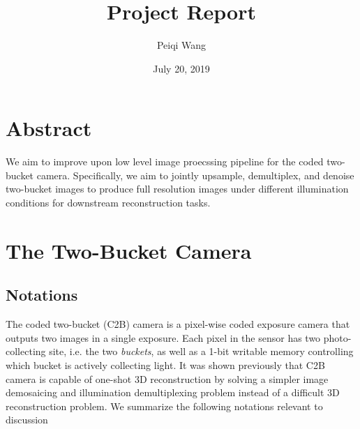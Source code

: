 \documentclass[11pt]{article}
\title{Project Report}
\author{Peiqi Wang}
\date{July 20, 2019}
\begin{document}
\maketitle
\newpage 
\tableofcontents
\newpage


\section{Abstract}
We aim to improve upon low level image proecssing pipeline for the coded two-bucket camera. Specifically, we aim to jointly upsample, demultiplex, and denoise two-bucket images to produce full resolution images under different illumination conditions for downstream reconstruction tasks.


\section{The Two-Bucket Camera}

\subsection{Notations}

The coded two-bucket (C2B) camera is a pixel-wise coded exposure camera that outputs two images in a single exposure.\cite{weiCodedTwoBucketCameras2018} Each pixel in the sensor has two photo-collecting site, i.e. the two \textit{buckets}, as well as a 1-bit writable memory controlling which bucket is actively collecting light. It was shown previously that C2B camera is capable of one-shot 3D reconstruction by solving a simpler image demosaicing and illumination demultiplexing problem instead of a difficult 3D reconstruction problem. We summarize the following notations relevant to discussion
\end{document}
